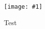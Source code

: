 \documentclass[12pt]{article}
\newcommand\createfigure[2]{
  \begin{figure}[H]
    \centering \texttt{[image: \#1]}
    \caption{#2}
  \end{figure}}
\begin{document}
\createfigure{../Software-Plan/main-unit-rtc-isr.png}{Test}
\end{document}
